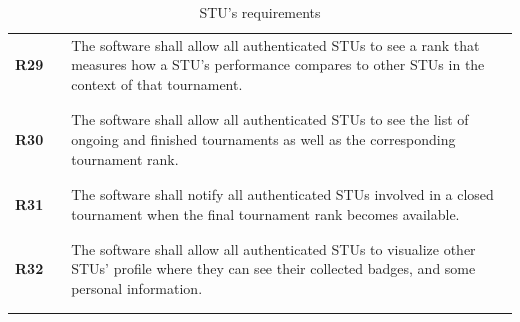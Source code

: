 \begin{longtable}[H]{l l p{12cm}}
    \textbf{R29} & \vline & The software shall allow all authenticated STUs to see a rank that measures how a STU's performance compares to other STUs in the context of that tournament.                                                         \\
                 &        &                                                                                                                                                                                                                       \\\hline & & \\
    \textbf{R30} & \vline & The software shall allow all authenticated STUs to see the list of ongoing and finished tournaments as well as the corresponding tournament rank.                                                                     \\
                 &        &                                                                                                                                                                                                                       \\\hline & & \\
    \textbf{R31} & \vline & The software shall notify all authenticated STUs involved in a closed tournament when the final tournament rank becomes available.                                                                                    \\
                 &        &                                                                                                                                                                                                                       \\\hline & & \\
    \textbf{R32} & \vline & The software shall allow all authenticated STUs to visualize other STUs' profile where they can see their collected badges, and some personal information.                                                            \\
                 &        &                                                                                                                                                                                                                       \\
    \hline
    \caption{STU's requirements}
\end{longtable}

\newpage

